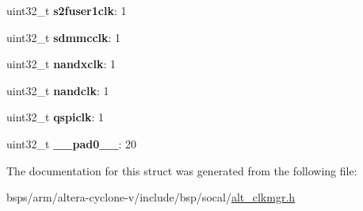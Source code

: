 \begin{DoxyCompactItemize}
uint32\+\_\+t {\bfseries s2fuser1clk}\+: 1
\item 
\mbox{\label{structALT__CLKMGR__PERPLL__EN__s_a1677085d180b4145a4a382b5767b26f9}} 
uint32\+\_\+t {\bfseries sdmmcclk}\+: 1
\item 
\mbox{\label{structALT__CLKMGR__PERPLL__EN__s_a65f14b9c28d8a0f7691db3f0c50edef5}} 
uint32\+\_\+t {\bfseries nandxclk}\+: 1
\item 
\mbox{\label{structALT__CLKMGR__PERPLL__EN__s_a2d1a7891deeaea71f251c2269b8eda20}} 
uint32\+\_\+t {\bfseries nandclk}\+: 1
\item 
\mbox{\label{structALT__CLKMGR__PERPLL__EN__s_af2a54cf057471f3960048d9710d9117f}} 
uint32\+\_\+t {\bfseries qspiclk}\+: 1
\item 
\mbox{\label{structALT__CLKMGR__PERPLL__EN__s_a6ea969d8578e982187f2f960e705c993}} 
uint32\+\_\+t {\bfseries \+\_\+\+\_\+pad0\+\_\+\+\_\+}\+: 20
\end{DoxyCompactItemize}


The documentation for this struct was generated from the following file\+:\begin{DoxyCompactItemize}
\item 
bsps/arm/altera-\/cyclone-\/v/include/bsp/socal/\mbox{\hyperlink{alt__clkmgr_8h}{alt\+\_\+clkmgr.\+h}}\end{DoxyCompactItemize}
